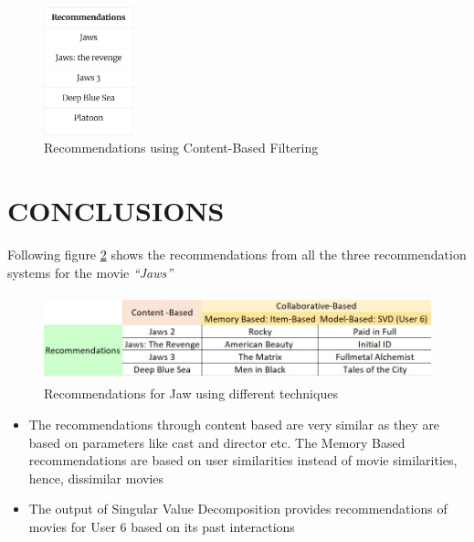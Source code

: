 \documentclass[a4paper,10pt]{article}
\begin{document}
\begin{itemize}
\begin{figure}[H]
        
        \centering
        \includegraphics[height=3.7cm]{figures/content_output.png}
        \caption{Recommendations using Content-Based Filtering}
        \label{recommend(content)}
\end{figure}

\end{itemize}

\section{CONCLUSIONS}
Following figure \ref{conclude} shows the recommendations from all the three recommendation systems for the movie \textit{“Jaws”}

\begin{figure}[H]
        
        \centering
        \includegraphics[height=2.5cm]{figures/conclude.jpg}
        \caption{Recommendations for Jaw using different techniques}
        \label{conclude}
\end{figure}

\begin{itemize}
    \item The recommendations through content based are very similar as they are based on parameters like cast and director etc. The Memory Based recommendations are based on user similarities instead of movie similarities, hence, dissimilar movies
    \item The output of Singular Value Decomposition provides recommendations of movies for User 6 based on its past interactions 


\end{itemize}
\end{document}
